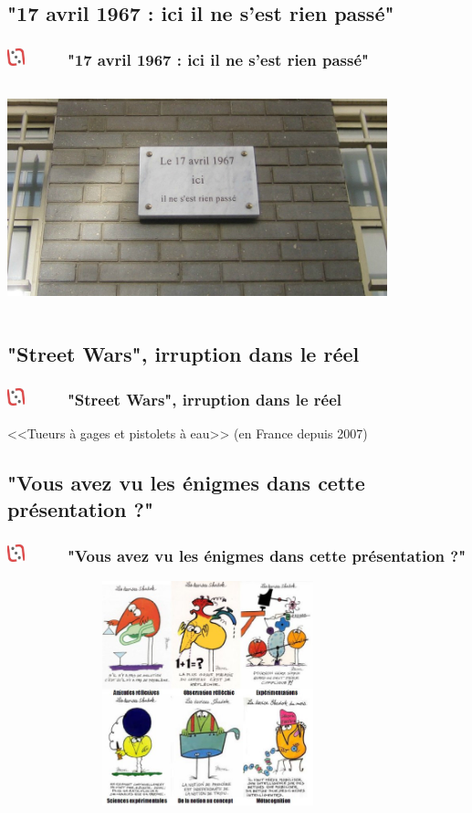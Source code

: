 \documentclass[slidetop,11pt]{beamer}
\def\sectionPartIIIa{"17 avril 1967 : ici il ne s'est rien pass{\'e}"}
\def\sectionPartIIIb{"Street Wars", irruption dans le r{\'e}el}
\def\sectionPartIIIc{"Vous avez vu les {\'e}nigmes dans cette pr{\'e}sentation ?"}
\def\moreInFrameTitleLeftt{\includegraphics[height=0.5cm]{img/ligueludique-0.png}~~~~~}
\begin{document}
\subsection{\sectionPartIIIa}
\begin{frame}
	\frametitle{\moreInFrameTitleLeftt \sectionPartIIIa}
	\begin{center}
		\includegraphics[height=6.5cm,width=11.0cm]{img/84869389_o.png} %
	\end{center}
\end{frame}

\subsection{\sectionPartIIIb}
\begin{frame}
	\frametitle{\moreInFrameTitleLeftt \sectionPartIIIb}
	\begin{center}
		<<Tueurs {\`a} gages et pistolets {\`a} eau>> (en France depuis 2007)
	\end{center}
\end{frame}

\subsection{\sectionPartIIIc}
\begin{frame}
	\frametitle{\moreInFrameTitleLeftt \sectionPartIIIc}
	\begin{center}
		\includegraphics[height=6.5cm,width=11.6cm]{img/shadoks_devises.png} 
	\end{center}
\end{frame}
\end{document}
